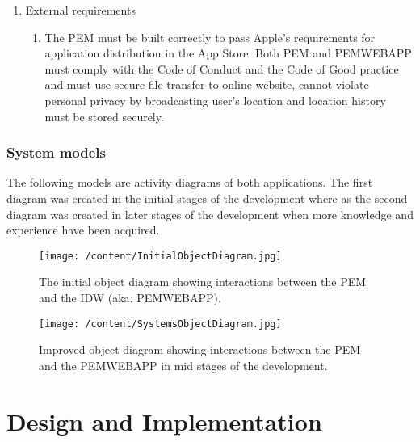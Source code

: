 \documentclass[12pt, a4paper]{report}   %
\begin{document}
\begin{enumerate}
\begin{enumerate}
		\item External requirements
		\begin{enumerate}
			\item The PEM must be built correctly to pass Apple's requirements for application distribution in the App Store. Both PEM and PEMWEBAPP must comply with the Code of Conduct and the Code of Good practice and must use secure file transfer to online website, cannot violate personal privacy by broadcasting user's location and location history must be stored securely.
		\end{enumerate}
	\end{enumerate}
	

\subsection{System models}
The following models are activity diagrams of both applications. The first diagram was created in the initial stages of the development where as the second diagram was created in later stages of the development when more knowledge and experience have been acquired.


\begin{figure}[H]
  \centering
	\texttt{[image: /content/InitialObjectDiagram.jpg]}
	  \caption{The initial object diagram showing interactions between the PEM and the IDW (aka. PEMWEBAPP).}
\end{figure}


 \begin{figure}[H]
 \begin{sideways}
 \begin{minipage}{19cm}
	\texttt{[image: /content/SystemsObjectDiagram.jpg]}
	  \caption{Improved object diagram showing interactions between the PEM and the PEMWEBAPP in mid stages of the development.}
 \end{minipage}
 \end{sideways}
 \centering
 \end{figure}


\chapter{Design and Implementation}

\end{enumerate}
\end{document}
